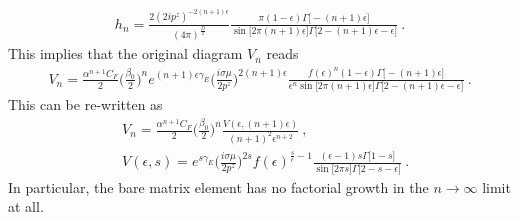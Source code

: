 \documentclass[a4paper,11pt]{article}
\begin{document}
\begin{align}\label{eq:HLfn}
h_n=\frac{2(2ip^z)^{-2(n+1)\epsilon}}{(4\pi)^{\frac{D}{2}}}\frac{\pi(1-\epsilon)\Gamma\big[-(n+1)\epsilon\big]}{\sin \big[2\pi(n+1)\epsilon\big] \Gamma\big[2-(n+1)\epsilon-\epsilon\big]} \ .
\end{align}
This implies that the original diagram $V_n$ reads
\begin{align}
V_n=\frac{\alpha^{n+1}C_F}{2}\bigg(\frac{\beta_0}{2}\bigg)^n e^{(n+1)\epsilon\gamma_E}\bigg(\frac{i\sigma\mu}{2p^z}\bigg)^{2(n+1)\epsilon}\frac{f(\epsilon)^n(1-\epsilon)\Gamma\big[-(n+1)\epsilon\big]}{\epsilon^n\sin \big[2\pi(n+1)\epsilon\big] \Gamma\big[2-(n+1)\epsilon-\epsilon\big]} \ .
\end{align}
This can be re-written as
\begin{align}
&V_n=\frac{\alpha^{n+1}C_F}{2}\bigg(\frac{\beta_0}{2}\bigg)^n\frac{V(\epsilon,(n+1)\epsilon)}{(n+1)^2\epsilon^{n+2}} \ , \\
&V(\epsilon,s)=e^{s\gamma_E}\bigg(\frac{i\sigma\mu}{2p^z}\bigg)^{2s}f(\epsilon)^{\frac{s}{\epsilon}-1}\frac{(\epsilon-1)s\Gamma\big[1-s\big]}{\sin \big[2\pi s\big] \Gamma\big[2-s-\epsilon\big]} \ .
\end{align}
In particular, the bare matrix element has no factorial growth in the $n\rightarrow \infty$ limit at all. 
\end{document}
